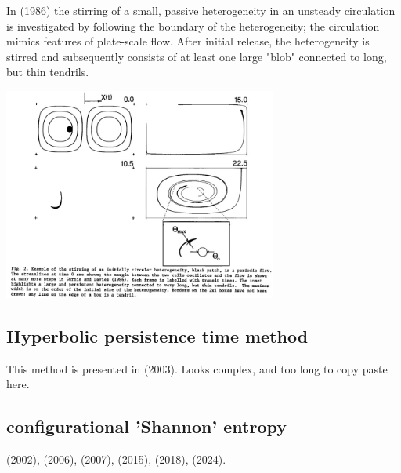 In \textcite{gurn86} (1986) the stirring
of a small, passive
heterogeneity
in an unsteady circulation
is investigated by following
the boundary of the heterogeneity;
the circulation mimics features
of plate-scale flow.
After initial release,
the heterogeneity is stirred
and subsequently consists of at least one
large "blob" connected to long, but thin tendrils.

\begin{center}
\includegraphics[width=9cm]{images/mixing/gurn86}
\end{center}

\subsection{Hyperbolic persistence time method}

This method is presented in \textcite{fasa03} (2003).
Looks complex, and too long to copy paste here.



\subsection{configurational 'Shannon' entropy}

\textcite{gobo02} (2002), 
\textcite{cakm06} (2006),
\textcite{nake07} (2007), 
\textcite{pedp15} (2015),
\textcite{bipe18} (2018),
\textcite{vatv24} (2024).



